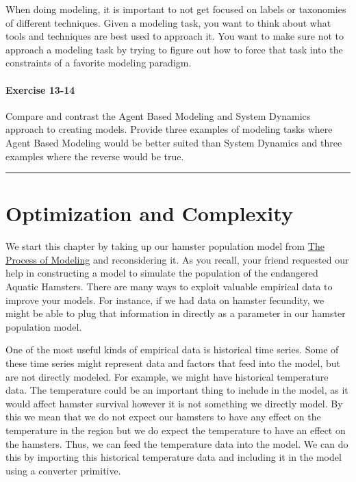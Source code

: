\documentclass[]{memoir}
\begin{document}
When doing modeling, it is important to not get focused on labels or
taxonomies of different techniques. Given a modeling task, you want to
think about what tools and techniques are best used to approach it. You
want to make sure not to approach a modeling task by trying to figure
out how to force that task into the constraints of a favorite modeling
paradigm.

\subsubsection{Exercise 13-14}

Compare and contrast the Agent Based Modeling and System Dynamics
approach to creating models. Provide three examples of modeling tasks
where Agent Based Modeling would be better suited than System Dynamics
and three examples where the reverse would be true.

\begin{center}\rule{3in}{0.4pt}\end{center}

\chapter{Optimization and Complexity}

We start this chapter by taking up our hamster population model from
\hyperref[ModelingProcess]{The Process of Modeling} and reconsidering
it. As you recall, your friend requested our help in constructing a
model to simulate the population of the endangered Aquatic Hamsters.
There are many ways to exploit valuable empirical data to improve your
models. For instance, if we had data on hamster fecundity, we might be
able to plug that information in directly as a parameter in our hamster
population model.

One of the most useful kinds of empirical data is historical time
series. Some of these time series might represent data and factors that
feed into the model, but are not directly modeled. For example, we might
have historical temperature data. The temperature could be an important
thing to include in the model, as it would affect hamster survival
however it is not something we directly model. By this we mean that we
do not expect our hamsters to have any effect on the temperature in the
region but we do expect the temperature to have an effect on the
hamsters. Thus, we can feed the temperature data into the model. We can
do this by importing this historical temperature data and including it
in the model using a converter primitive.
\end{document}
